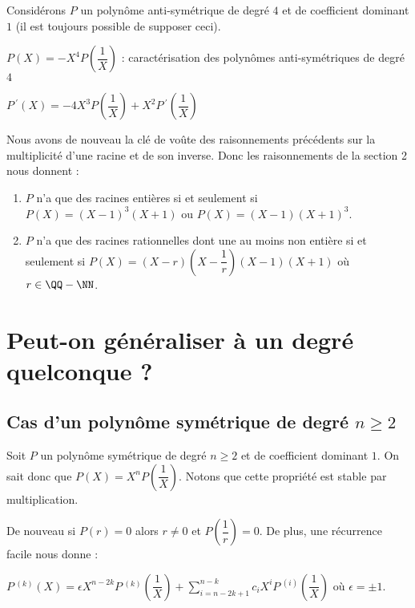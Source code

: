 \documentclass[12pt]{amsart}
\begin{document}
Considérons $P$ un polynôme anti-symétrique de degré $4$ et de coefficient dominant $1$ (il est toujours possible de supposer ceci).

\medskip

$P(X) = -X^4 P\left( \dfrac1X \right)$ : caractérisation des polynômes anti-symétriques de degré $4$

\medskip

$P\,^{\prime}(X) = - 4 X^3 P\left( \dfrac1X \right) 
            + X^2 P\,^{\prime}\left( \dfrac1X \right)$


\medskip

Nous avons de nouveau la clé de voûte des raisonnements précédents sur la multiplicité d'une racine et de son inverse.
Donc les raisonnements de la section 2 nous donnent :

\begin{enumerate}
	\item $P$ n'a que des racines entières si et seulement si $P(X) = (X - 1)^3 (X + 1)$ ou $P(X) = (X - 1) (X + 1)^3$.

	\item $P$ n'a que des racines rationnelles dont une au moins non entière si et seulement si $P(X) = (X - r) \left( X - \dfrac1r \right) (X - 1) (X + 1)$ où $r \in \QQ - \NN$.
\end{enumerate}



\section{Peut-on généraliser à un degré quelconque ?}

\subsection*{Cas d'un polynôme symétrique de degré $n \geqslant 2$}

Soit $P$ un polynôme symétrique de degré $n \geqslant 2$ et de coefficient dominant $1$. On sait donc que $P(X) = X^n P\left( \dfrac1X \right)$. Notons que cette propriété est stable par multiplication. 

\medskip

De nouveau si $P(r) = 0$ alors $r \neq 0$ et $P\left( \dfrac1r \right) = 0$.
De plus, une récurrence facile nous donne :

\medskip

$\displaystyle
  P\,^{(k)}(X) 
=
  \epsilon X^{n - 2k} P\,^{(k)}\left( \dfrac1X \right)
+
  \sum_{i = n - 2k + 1}^{n - k} c_i X^i P\,^{(i)}\left( \dfrac1X \right)$
où $\epsilon = \pm 1$.
\end{document}

